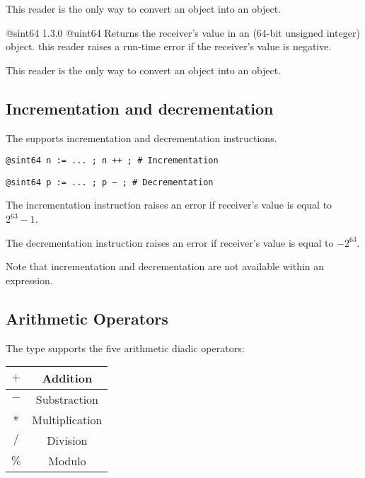 This reader is the only way to convert an  object into an  object.





{@sint64}
{1.3.0}
{@uint64}
{Returns the receiver's value in an  (64-bit unsigned integer) object.}
{this reader raises a run-time error if the receiver's value is negative.}

This reader is the only way to convert an  object into an  object.







\subsection{Incrementation and decrementation}

The  supports incrementation and decrementation instructions.

\texttt{@sint64 n := ... ; n ++ ; \# Incrementation}

\texttt{@sint64 p := ... ; p -- ; \# Decrementation}\newline

The incrementation instruction raises an error if receiver's value is equal to $2^{63}-1$.\newline

The decrementation instruction raises an error if receiver's value is equal to $-2^{63}$.\newline

Note that incrementation and decrementation are not available within an expression.




\subsection{Arithmetic Operators}

The  type supports the five arithmetic diadic operators:\newline

\begin{tabular}{|c|c|}
\hline
$+$ & Addition \\
\hline
$-$ & Substraction \\
\hline
$*$ & Multiplication \\
\hline
$/$ & Division \\
\hline
$\%$ & Modulo \\
\hline
\end{tabular}

